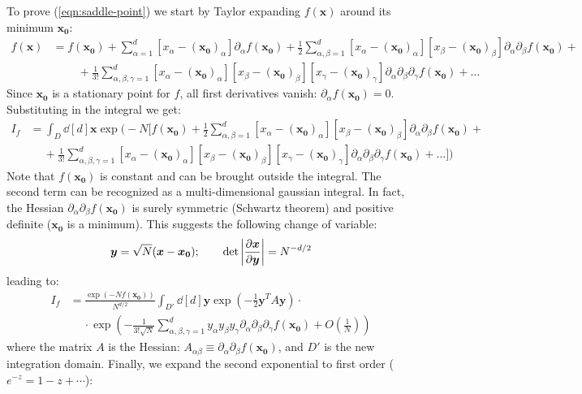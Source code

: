 \documentclass[../../main.tex]{subfiles}
\begin{document}
To prove (\ref{eqn:saddle-point}) we start by Taylor expanding $f(\bm{x})$ around its minimum $\bm{x_0}$:
\begin{align*}
    f(\bm{x}) &= f(\bm{x_0}) + \sum_{\alpha=1}^d  [x_\alpha - (\bm{x_{0}})_\alpha] \partial_\alpha f(\bm{x_0}) + \frac{1}{2} \sum_{\alpha,\beta=1}^d [x_\alpha - (\bm{x_{0}})_\alpha] [x_\beta - (\bm{x_{0}})_\beta] \partial_\alpha \partial_\beta f(\bm{x_0}) + \\
    &\qquad\> + \frac{1}{3!} \sum_{\alpha,\beta, \gamma=1}^d [x_\alpha - (\bm{x_{0}})_\alpha][x_\beta - (\bm{x_{0}})_\beta] [x_\gamma - (\bm{x_{0}})_\gamma]\partial_\alpha \partial_\beta \partial_\gamma f(\bm{x_0}) + \dots
\end{align*}
Since $\bm{x_0}$ is a stationary point for $f$, all first derivatives vanish: $\partial_\alpha f(\bm{x_0}) = 0$. Substituting in the integral we get:
\begin{align*}
    I_f &= \int_D \dd[d]{\bm{x}}\exp\Bigg(-N \Big[f(\bm{x_0}) + \frac{1}{2} \sum_{\alpha,\beta=1}^d [x_\alpha - (\bm{x_{0}})_\alpha] [x_\beta - (\bm{x_{0}})_\beta] \partial_\alpha \partial_\beta f(\bm{x_0}) +\\
    &\quad \> + \frac{1}{3!} \sum_{\alpha,\beta, \gamma=1}^d [x_\alpha - (\bm{x_{0}})_\alpha][x_\beta - (\bm{x_{0}})_\beta] [x_\gamma - (\bm{x_{0}})_\gamma]\partial_\alpha \partial_\beta \partial_\gamma f(\bm{x_0}) + \dots
    \Big]\Bigg)
\end{align*}
Note that $f(\bm{x_0})$ is constant and can be brought outside the integral. The second term can be recognized as a multi-dimensional gaussian integral. In fact, the Hessian $\partial_\alpha \partial_\beta f(\bm{x_0})$ is surely symmetric (Schwartz theorem) and positive definite ($\bm{x_0}$ is a minimum). This suggests the following change of variable:
\begin{align}\label{eqn:cov1}
    \bm{y} = \sqrt{N} (\bm{x} - \bm{x_0}); \qquad \operatorname{det}\left|\pdv{\bm{x}}{\bm{y}} \right| = N^{-d/2}
\end{align}
leading to:
\begin{align*}
    I_f &= \frac{\exp(-N f(\bm{x_0}))}{N^{d/2}} \int_{D'} \dd[d]{\bm{y}} \exp\left(-\frac{1}{2} \bm{y}^T A \bm{y}\right) \cdot \\
    &\quad \> \cdot \exp\left( - \frac{1}{3! \sqrt{N}} \sum_{\alpha, \beta, \gamma=1}^d y_\alpha y_\beta y_\gamma \partial_\alpha \partial_\beta \partial_\gamma f(\bm{x_0}) + O\left(\frac{1}{N} \right) \right)
\end{align*}
where the matrix $A$ is the Hessian: $A_{\alpha \beta} \equiv \partial_\alpha \partial_\beta f(\bm{x_0})$, and $D'$ is the new integration domain. Finally, we expand the second exponential to first order ($e^{-z} = 1 - z + \cdots$):
\end{document}
